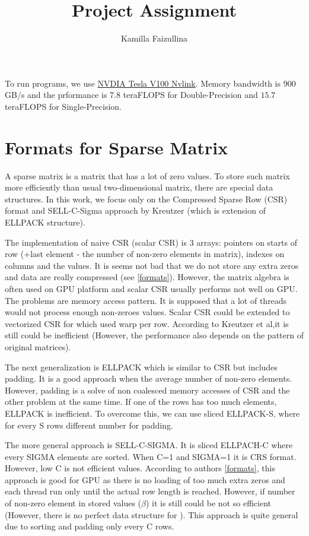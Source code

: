 \documentclass{article}
\title{Project Assignment}
\author{ Kamilla Faizullina}
\date{\empty}
\begin{document}
\maketitle
 To run programs, we use \href{https://www.nvidia.com/en-us/data-center/v100/}{NVDIA Tesla V100 Nvlink}. Memory bandwidth is  $900$ GB/s and the prformance is $7.8$  teraFLOPS for Double-Precision and $15.7$ teraFLOPS for Single-Precision.

\section{Formats for Sparse Matrix}
A sparse matrix is a matrix that has a lot of zero values. To store such matrix more efficiently than usual two-dimensional matrix, there are special data structures. In this work, we focus only on the Compressed Sparse Row (CSR) format and SELL-C-Sigma approach by Kreutzer (which is extension of ELLPACK structure). 

The implementation of naive CSR (scalar CSR) is 3 arrays: pointers on starts of row (+last element - the number of non-zero elements in matrix), indexes on columns and the values. It is seems not bad that we do not store any extra zeros and data are really compressed (see \ref{formats}). However, the matrix algebra is often used on GPU platform and scalar CSR usually performs not well on GPU.  The problems are memory access pattern. It is supposed that a lot of threads would not process enough non-zeroes values. Scalar CSR could be extended to vectorized CSR for which used  warp per row. According to Kreutzer et al,it is still could be inefficient (However, the performance also depends on the pattern of original matrices). 

The next generalization is ELLPACK which is similar to CSR but includes padding. It is a good approach when the average number of non-zero elements. However, padding is a solve of non coalesced memory accesses of CSR and the other problem at the same time. If one of the rows has too much elements, ELLPACK is inefficient. To overcome this, we can use sliced ELLPACK-S, where for every S rows different number for padding. 

The more general approach is SELL-C-SIGMA. It is sliced ELLPACH-C where every SIGMA elements are sorted. When C=1 and SIGMA=1 it is CRS format. However, low C is not efficient values. According to authors \ref{formats}, this approach is good for GPU as there is no loading of too much extra zeros and each thread run only until the actual row length is reached. However, if number of non-zero element in stored values ($\beta$) it is still could be not so efficient (However, there is no perfect data structure for ). This approach is quite general due to sorting and padding only every C rows. 
\end{document}
